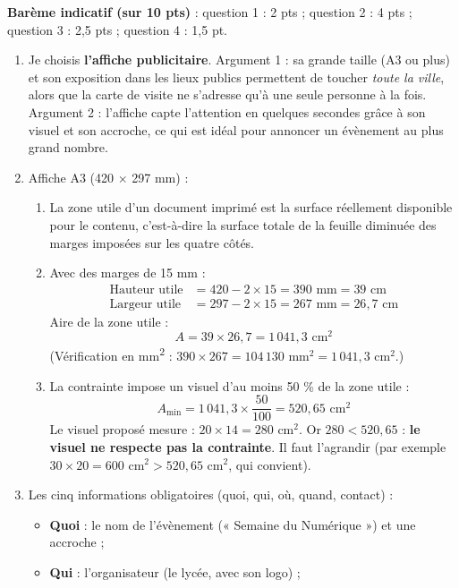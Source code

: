 \documentclass[11pt]{article}
\newcommand{\cle}[1]{{\popxbold\color{popdark}#1}}
\begin{document}
\begin{corrige}
\textbf{Barème indicatif (sur 10 pts)} : question 1 : 2 pts ; question 2 : 4 pts ; question 3 : 2,5 pts ; question 4 : 1,5 pt.

\begin{enumerate}
\item Je choisis \textbf{l'affiche publicitaire}. Argument 1 : sa grande taille (A3 ou plus) et son exposition dans les lieux publics permettent de toucher \emph{toute la ville}, alors que la carte de visite ne s'adresse qu'à une seule personne à la fois. Argument 2 : l'affiche capte l'attention en quelques secondes grâce à son visuel et son accroche, ce qui est idéal pour annoncer un évènement au plus grand nombre.
\item Affiche A3 (420 $\times$ 297 mm) :
\begin{enumerate}
\item La \cle{zone utile} d'un document imprimé est la surface réellement disponible pour le contenu, c'est-à-dire la surface totale de la feuille diminuée des marges imposées sur les quatre côtés.
\item Avec des marges de 15 mm :
\begin{align*}
\text{Hauteur utile} &= 420 - 2 \times 15 = 390 \text{ mm} = 39 \text{ cm}\\
\text{Largeur utile} &= 297 - 2 \times 15 = 267 \text{ mm} = 26{,}7 \text{ cm}
\end{align*}
Aire de la zone utile :
\[ A = 39 \times 26{,}7 = 1\,041{,}3 \text{ cm}^2 \]
(Vérification en mm\textsuperscript{2} : $390 \times 267 = 104\,130 \text{ mm}^2 = 1\,041{,}3 \text{ cm}^2$.)
\item La contrainte impose un visuel d'au moins 50 \% de la zone utile :
\[ A_{\min} = 1\,041{,}3 \times \dfrac{50}{100} = 520{,}65 \text{ cm}^2 \]
Le visuel proposé mesure : $20 \times 14 = 280 \text{ cm}^2$. Or $280 < 520{,}65$ : \textbf{le visuel ne respecte pas la contrainte}. Il faut l'agrandir (par exemple $30 \times 20 = 600 \text{ cm}^2 > 520{,}65 \text{ cm}^2$, qui convient).
\end{enumerate}
\item Les cinq informations obligatoires (quoi, qui, où, quand, contact) :
\begin{itemize}
\item \textbf{Quoi} : le nom de l'évènement (« Semaine du Numérique ») et une accroche ;
\item \textbf{Qui} : l'organisateur (le lycée, avec son logo) ;

\end{itemize}
\end{enumerate}
\end{corrige}
\end{document}
